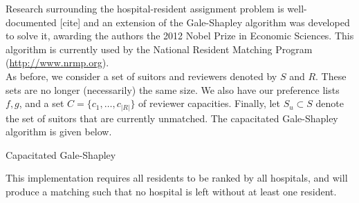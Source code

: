 Research surrounding the hospital-resident assignment problem is well-documented 
[cite] and an extension of the Gale-Shapley algorithm was developed to solve it,
awarding the authors the 2012 Nobel Prize in Economic Sciences. This algorithm
is currently used by the National Resident Matching Program 
(\url{http://www.nrmp.org}). \\

As before, we consider a set of suitors and reviewers denoted by \(S\) and 
\(R\). These sets are no longer (necessarily) the same size. We also have our 
preference lists \(f, g\), and a set \(C = \{c_1, \ldots, c_{|R|}\}\) of 
reviewer capacities. Finally, let \(S_u \subset S\) denote the set of suitors 
that are currently unmatched. The capacitated Gale-Shapley algorithm is given 
below.

\begin{algorithm}[H]
\caption{Capacitated Gale-Shapley}\label{alg:cap-galeshapley}
    \begin{algorithmic}[0]
	    \EndFor
	    \EndFor
		    \Else
		        \Else
				            \Else
				            \EndIf
			            \EndIf
			        \EndFor
		        \EndIf
		    \EndIf
	    \EndWhile
	\end{algorithmic}
\end{algorithm}

\begin{remark}
	This implementation requires all residents to be ranked by all hospitals, 
    and will produce a matching such that no hospital is left without at least 
    one resident.
\end{remark}


